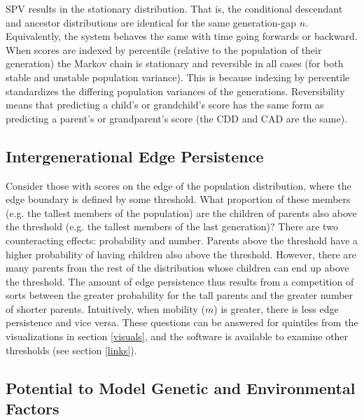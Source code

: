\documentclass{svproc} %
\begin{document}
SPV results in the stationary distribution. That is, the conditional descendant and ancestor distributions are identical for the same generation-gap $n$. Equivalently, the system behaves the same with time going forwards or backward. When scores are indexed by percentile (relative to the population of their generation) the Markov chain is stationary and reversible in all cases (for both stable and unstable population variance). This is because indexing by percentile standardizes the differing population variances of the generations. Reversibility means that predicting a child's or grandchild's score has the same form as predicting a parent's or grandparent's score (the CDD and CAD are the same). 

\subsection{Intergenerational Edge Persistence}

Consider those with scores on the edge of the population distribution, where the edge boundary is defined by some threshold. What proportion of these members (e.g. the tallest members of the population) are the children of parents also above the threshold (e.g. the tallest members of the last generation)? There are two counteracting effects: probability and number. Parents above the threshold have a higher probability of having children also above the threshold. However, there are many parents from the rest of the distribution whose children can end up above the threshold. The amount of edge persistence thus results from a competition of sorts between the greater probability for the tall parents and the greater number of shorter parents. Intuitively, when mobility ($m$) is greater, there is less edge persistence and vice versa. These questions can be answered for quintiles from the visualizations in section \ref{visuals}, and the software is available to examine other thresholds (see section \ref{links}). 


\subsection{Potential to Model Genetic and Environmental Factors}
\end{document}
